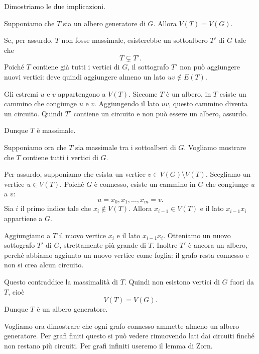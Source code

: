 \documentclass[a4paper]{article}
\begin{document}
\begin{snippetproof}{}
    Dimostriamo le due implicazioni.

    \begin{iffproof}
        \item Supponiamo che \(T\) sia un albero generatore di \(G\). Allora \(V(T)=V(G)\).

        Se, per assurdo, \(T\) non fosse massimale, esisterebbe un sottoalbero \(T'\) di \(G\) tale che
        \[
            T \subsetneq T'.
        \]
        Poiché \(T\) contiene già tutti i vertici di \(G\), il sottografo \(T'\) non può aggiungere nuovi vertici: deve quindi aggiungere almeno un lato \(uv\notin E(T)\).

        Gli estremi \(u\) e \(v\) appartengono a \(V(T)\). Siccome \(T\) è un albero, in \(T\) esiste un cammino che congiunge \(u\) e \(v\). Aggiungendo il lato \(uv\), questo cammino diventa un circuito. Quindi \(T'\) contiene un circuito e non può essere un albero, assurdo.

        Dunque \(T\) è massimale.

        \item Supponiamo ora che \(T\) sia massimale tra i sottoalberi di \(G\). Vogliamo mostrare che \(T\) contiene tutti i vertici di \(G\).

        Per assurdo, supponiamo che esista un vertice \(v\in V(G)\setminus V(T)\). Scegliamo un vertice \(u\in V(T)\). Poiché \(G\) è connesso, esiste un cammino in \(G\) che congiunge \(u\) a \(v\):
        \[
            u=x_0,x_1,\ldots,x_m=v.
        \]
        Sia \(i\) il primo indice tale che \(x_i\notin V(T)\). Allora \(x_{i-1}\in V(T)\) e il lato \(x_{i-1}x_i\) appartiene a \(G\).

        Aggiungiamo a \(T\) il nuovo vertice \(x_i\) e il lato \(x_{i-1}x_i\). Otteniamo un nuovo sottografo \(T'\) di \(G\), strettamente più grande di \(T\). Inoltre \(T'\) è ancora un albero, perché abbiamo aggiunto un nuovo vertice come foglia: il grafo resta connesso e non si crea alcun circuito.

        Questo contraddice la massimalità di \(T\). Quindi non esistono vertici di \(G\) fuori da \(T\), cioè
        \[
            V(T)=V(G).
        \]
        Dunque \(T\) è un albero generatore.
    \end{iffproof}
\end{snippetproof}

Vogliamo ora dimostrare che ogni grafo connesso ammette almeno un albero generatore. Per grafi finiti questo si può vedere rimuovendo lati dai circuiti finché non restano più circuiti. Per grafi infiniti useremo il lemma di Zorn.
\end{document}
